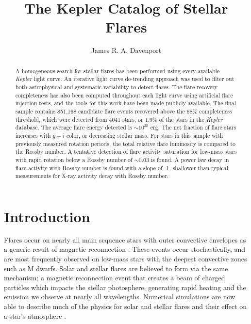 \documentclass[twocolumn]{aastex6}
\newcommand{\Kepler}{\textsl{Kepler}\xspace}
\begin{document}
\title{The Kepler Catalog of Stellar Flares}


\author{
	James R. A. Davenport
	}



\begin{abstract}
A homogeneous search for stellar flares has been performed using every available \Kepler light curve. An iterative light curve de-trending approach was used to filter out both astrophysical and systematic variability to detect flares. The flare recovery completeness has also been computed throughout each light curve using artificial flare injection tests, and the tools for this work have been made publicly available. The final sample contains 851,168 candidate flare events recovered above the 68\% completeness threshold, which were detected from 4041 stars, or 1.9\% of the stars in the \Kepler database. The average flare energy detected is $\sim$$10^{35}$ erg. The net fraction of flare stars increases with $g-i$ color, or decreasing stellar mass. For stars in this sample with previously measured rotation periods, the total relative flare luminosity is compared to the Rossby number. A tentative detection of flare activity saturation for low-mass stars with rapid rotation below a Rossby number of $\sim$0.03 is found. A power law decay in flare activity with Rossby number is found with a slope of -1,  shallower than typical measurements for X-ray activity decay with Rossby number.
\end{abstract}


\section{Introduction}

Flares occur on nearly all main sequence stars with outer convective envelopes as a generic result of magnetic reconnection \citep{pettersen1989}. These events occur stochastically, and are most frequently observed on low-mass stars with the deepest convective zones such as M dwarfs. Solar and stellar flares are believed to form via the same mechanism: a magnetic reconnection event that creates a beam of charged particles which impacts the stellar photosphere, generating rapid heating and the emission we observe at nearly all wavelengths. Numerical simulations are now able to describe much of the physics for solar and stellar flares and their effect on a star's atmosphere \citep{allred2015}.
\end{document}
